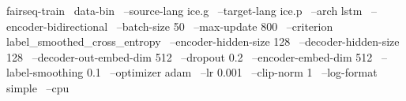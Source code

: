fairseq-train \
    data-bin \
    --source-lang ice.g \
    --target-lang ice.p \
    --arch lstm \
    --encoder-bidirectional \
    --batch-size 50 \
    --max-update 800 \
    --criterion label_smoothed_cross_entropy \
    --encoder-hidden-size 128 \
    --decoder-hidden-size 128 \
    --decoder-out-embed-dim 512 \
    --dropout 0.2 \
    --encoder-embed-dim 512 \
    --label-smoothing 0.1 \
    --optimizer adam \
    --lr 0.001 \
    --clip-norm 1 \
    --log-format simple \
    --cpu
